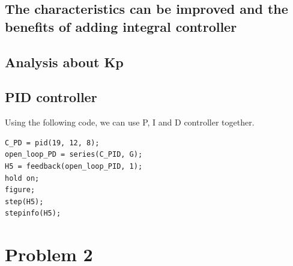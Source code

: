 \documentclass[a4paper, titlepage, twocolumn, 10pt]{article}
\begin{document}
	\subsection{The characteristics can be improved and the benefits of adding integral controller}
	
	\subsection{Analysis about Kp}
	
	\subsection{PID controller}
	Using the following code, we can use P, I and D controller together.
\begin{lstlisting}[frame=single]
C_PD = pid(19, 12, 8);
open_loop_PD = series(C_PID, G);
H5 = feedback(open_loop_PID, 1);
hold on;
figure;
step(H5);
stepinfo(H5);
\end{lstlisting}


	\section{Problem 2}	
	
\end{document}
